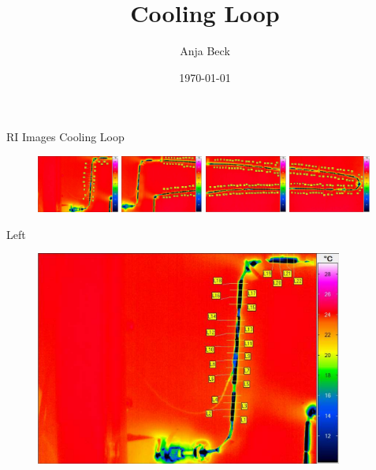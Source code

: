 \documentclass[10pt]{beamer}
\title{Cooling Loop}
\author{Anja Beck}
\date{\today}
\institute{DESY Hamburg}
\begin{document}
	
	\begin{frame}
		\titlepage
	\end{frame}
\begin{frame}{RI Images Cooling Loop}
	\begin{figure}
		\centering
		\includegraphics[width=0.24\textwidth]{../Labels/LabelsLeft.pdf}
		\includegraphics[width=0.24\textwidth]{../Labels/LabelsCentreLeft.pdf}
		\includegraphics[width=0.24\textwidth]{../Labels/LabelsCentreRight.pdf}
		\includegraphics[width=0.24\textwidth]{../Labels/LabelsRight.pdf}
	\end{figure}
\end{frame}
\begin{frame}{Left}
	\begin{figure}
		\centering
		\includegraphics[width=0.9\textwidth]{../Labels/LabelsLeft.pdf}
	\end{figure}
\end{frame}
\end{document}
